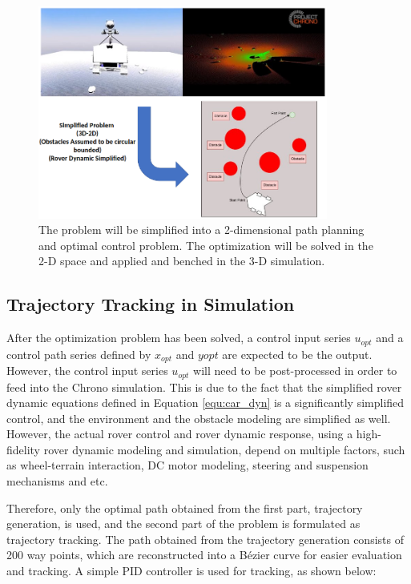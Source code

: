 \documentclass{article}
\begin{document}
\begin{figure}
\centering
    \label{fig:rover_path}
    \includegraphics[width=0.85\textwidth]{Images/rover_path.png}
    \caption{The problem will be simplified into a 2-dimensional path planning and optimal control problem. The optimization will be solved in the 2-D space and applied and benched in the 3-D simulation.}
\end{figure}

\subsection{Trajectory Tracking in Simulation}

After the optimization problem has been solved, a control input series \(u_{opt}\) and a control path series defined by \(x_{opt}\) and \(y{opt}\) are expected to be the output. However, the control input series \(u_{opt}\) will need to be post-processed in order to feed into the Chrono simulation. This is due to the fact that the simplified rover dynamic equations defined in Equation \ref{equ:car_dyn} is a significantly simplified control, and the environment and the obstacle modeling are simplified as well. However, the actual rover control and rover dynamic response, using a high-fidelity rover dynamic modeling and simulation, depend on multiple factors, such as wheel-terrain interaction, DC motor modeling, steering and suspension mechanisms and etc. 

Therefore, only the optimal path obtained from the first part, trajectory generation, is used, and the second part of the problem is formulated as trajectory tracking. The path obtained from the trajectory generation consists of 200 way points, which are reconstructed into a Bézier curve for easier evaluation and tracking. A simple PID controller is used for tracking, as shown below:
\end{document}
